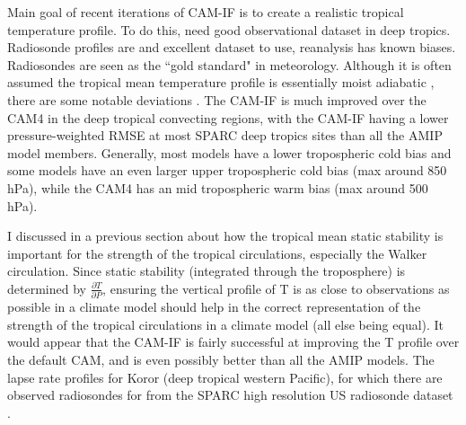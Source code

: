 \documentclass[letterpaper,12pt,titlepage,oneside,final]{book}
\begin{document}
Main goal of recent iterations of CAM-IF is to create a realistic tropical temperature profile. To do this, need good observational dataset in deep tropics. Radiosonde profiles are and excellent dataset to use, reanalysis has known biases. Radiosondes are seen as the ``gold standard" in meteorology. Although it is often assumed the tropical mean temperature profile is essentially moist adiabatic \cite{emanuel_quasi-equilibrium_2007}, there are some notable deviations \cite{folkins_melting_2013}. The CAM-IF is much improved over the CAM4 in the deep tropical convecting regions, with the CAM-IF having a lower pressure-weighted RMSE at most SPARC deep tropics sites than all the AMIP model members. Generally, most models have a lower tropospheric cold bias and some models have an even larger upper tropospheric cold bias (max around 850 hPa), while the CAM4 has an mid tropospheric warm bias (max around 500 hPa). 

I discussed in a previous section about how the tropical mean static stability is important for the strength of the tropical circulations, especially the Walker circulation. Since static stability (integrated through the troposphere) is determined by $\frac{\partial{T}}{\partial{P}}$, ensuring the vertical profile of T is as close to observations as possible in a climate model should help in the correct representation of the strength of the tropical circulations in a climate model (all else being equal). It would appear that the CAM-IF is fairly successful at improving the T profile over the default CAM, and is even possibly better than all the AMIP models. The lapse rate profiles for Koror (deep tropical western Pacific), for which there are observed radiosondes for from the SPARC high resolution US radiosonde dataset \cite{love_us_nodate}. 



%
\end{document}
